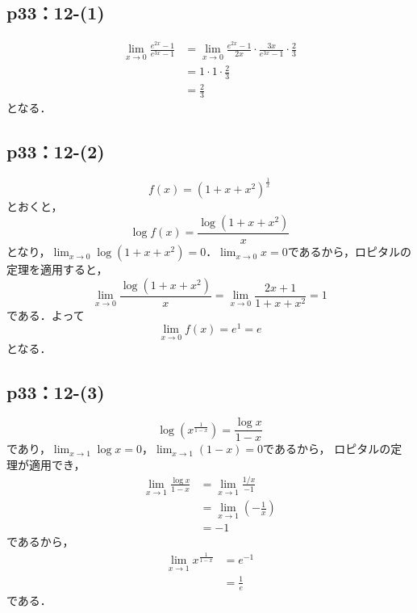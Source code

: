 \documentclass[uplatex,dvipdfmx,a4paper,10pt,fleqn]{jsarticle}
\newenvironment{tleftbar}{\begin{tbleftline}\setlength{\parindent}{1zw}}{\end{tbleftline}}
\begin{document}
\subsection*{p33：12-(1)}

\begin{tleftbar}
    \begin{align*} 
        \lim_{x \to 0} \frac{e^{2x}-1}{e^{3x}-1} & = \lim_{x \to 0} \frac{e^{2x}-1}{2x} \cdot \frac{3x}{e^{3x}-1} \cdot \frac{2}{3} \\
        & = 1 \cdot 1 \cdot \frac{2}{3} \\
        & = \frac{2}{3}
    \end{align*} 
    となる．
\end{tleftbar}


\subsection*{p33：12-(2)}

\begin{tleftbar}
    \[
        f(x)= (1+x+x^2)^{\frac{1}{x}}
    \]
    とおくと，
    \[
        \log f(x) = \frac{\log (1+x+x^2)}{x}
    \]
    となり，$\lim_{x \to 0} \log (1+x+x^2)=0$．$\lim_{x \to 0} x =0$であるから，ロピタルの定理を適用すると，
    \[
        \lim_{x \to 0} \frac{\log (1+x+x^2)}{x} =  \lim_{x \to 0}\frac{2x+1}{1+x+x^2} =1
    \]
    である．よって
    \[
        \lim_{x \to 0} f(x) = e^{1}=e
    \]
    となる．
\end{tleftbar}


\subsection*{p33：12-(3)}

\begin{tleftbar}
    \[
        \log (x^{\frac{1}{1-x}})= \frac{\log x}{1-x}
    \]
    であり，$\lim_{x \to 1} \log x = 0$，$\lim_{x \to 1} (1-x)=0$であるから，
    ロピタルの定理が適用でき，
    \begin{align*} 
        \lim_{ x\to 1} \frac{\log x}{1-x} & = \lim_{x \to 1} \frac{1/x}{-1} \\
        & = \lim_{x \to 1} \left(-\frac{1}{x} \right ) \\
        & = -1 
    \end{align*}
    であるから，
    \begin{align*} 
        \lim_{x \to 1} x^{\frac{1}{1-x}} &= e^{-1} \\
        &= \frac{1}{e}
    \end{align*}
    である．
\end{tleftbar}
\end{document}
